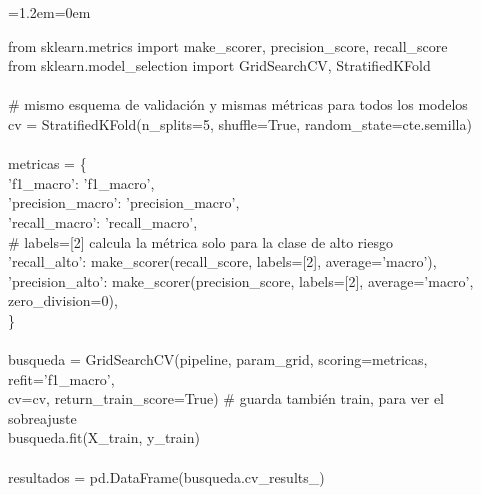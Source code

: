 \documentclass[11pt,a4paper]{article}
\newenvironment{codigo}
  {\par\smallskip\begin{list}{}{\leftmargin=1.2em\rightmargin=0em}\item\relax\ttfamily\scriptsize\raggedright}
  {\end{list}\smallskip}
\begin{document}
{\begin{codigo}
from sklearn.metrics import make\_\allowbreak{}scorer, precision\_\allowbreak{}score, recall\_\allowbreak{}score \\{}
from sklearn.model\_\allowbreak{}selection import GridSearchCV, StratifiedKFold \\{}
\mbox{} \\{}
\# mismo esquema de validación y mismas métricas para todos los modelos \\{}
cv = StratifiedKFold(n\_\allowbreak{}splits=5, shuffle=True, random\_\allowbreak{}state=cte.semilla) \\{}
\mbox{} \\{}
metricas = \{ \\{}
\hspace*{2.08em}'f1\_\allowbreak{}macro': 'f1\_\allowbreak{}macro', \\{}
\hspace*{2.08em}'precision\_\allowbreak{}macro': 'precision\_\allowbreak{}macro', \\{}
\hspace*{2.08em}'recall\_\allowbreak{}macro': 'recall\_\allowbreak{}macro', \\{}
\hspace*{2.08em}\# labels=[2] calcula la métrica solo para la clase de alto riesgo \\{}
\hspace*{2.08em}'recall\_\allowbreak{}alto': make\_\allowbreak{}scorer(recall\_\allowbreak{}score, labels=[2], average='macro'), \\{}
\hspace*{2.08em}'precision\_\allowbreak{}alto': make\_\allowbreak{}scorer(precision\_\allowbreak{}score, labels=[2], average='macro', zero\_\allowbreak{}division=0), \\{}
\} \\{}
\mbox{} \\{}
busqueda = GridSearchCV(pipeline, param\_\allowbreak{}grid, scoring=metricas, refit='f1\_\allowbreak{}macro', \\{}
\hspace*{12.48em}cv=cv, return\_\allowbreak{}train\_\allowbreak{}score=True)   \# guarda también train, para ver el sobreajuste \\{}
busqueda.fit(X\_\allowbreak{}train, y\_\allowbreak{}train) \\{}
\mbox{} \\{}
resultados = pd.DataFrame(busqueda.cv\_\allowbreak{}results\_\allowbreak{}) \\{}

\end{codigo}}
\end{document}
